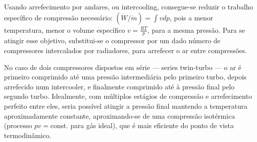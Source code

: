 Usando arrefecimento por andares, ou intercooling, consegue-se reduzir o trabalho específico de compressão necessário: $(\dot{W}/\dot{m}) = \int vdp$, pois a menor temperatura, menor o volume específico $v = \frac{RT}{p}$, para a mesma pressão.
Para se atingir esse objetivo, substitui-se o compressor por um dado número de compressores intercalados por radiadores, para arrefecer o ar entre compressões.

No caso de dois compressores dispostos em série — series twin-turbo — o ar é primeiro comprimido até uma pressão intermediária pelo primeiro turbo, depois arrefecido num intercooler, e finalmente comprimido até à pressão final pelo segundo turbo. Idealmente, com múltiplos estágios de compressão e arrefecimento perfeito entre eles, seria possível atingir a pressão final mantendo a temperatura aproximadamente constante, aproximando-se de uma compressão isotérmica (processo $pv=\text{const.}$ para gás ideal), que é mais eficiente do ponto de vista termodinâmico.

